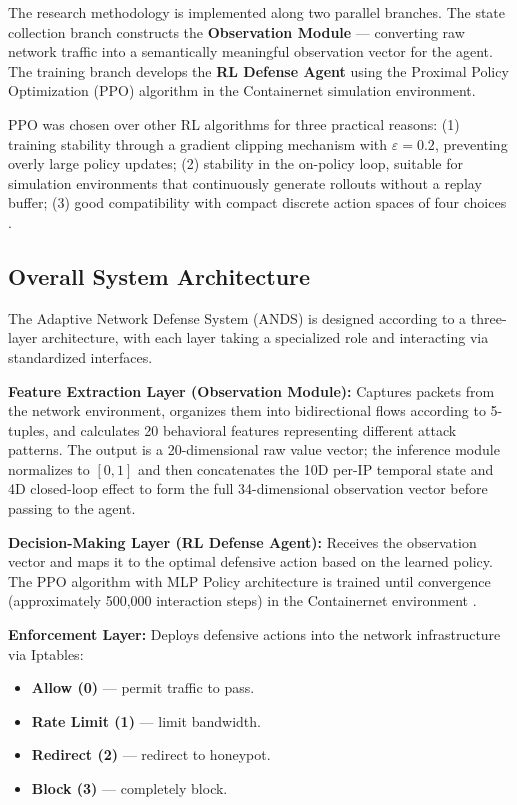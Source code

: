 \documentclass[12pt,a4paper]{report}
\begin{document}
The research methodology is implemented along two parallel branches. The state collection branch constructs the \textbf{Observation Module} --- converting raw network traffic into a semantically meaningful observation vector for the agent. The training branch develops the \textbf{RL Defense Agent} using the Proximal Policy Optimization (PPO) algorithm \cite{schulmanPPO2017} in the Containernet simulation environment.

PPO was chosen over other RL algorithms for three practical reasons: (1) training stability through a gradient clipping mechanism with $\varepsilon = 0.2$, preventing overly large policy updates; (2) stability in the on-policy loop, suitable for simulation environments that continuously generate rollouts without a replay buffer; (3) good compatibility with compact discrete action spaces of four choices \cite{schulmanPPO2017}.

\subsection{Overall System Architecture}

The Adaptive Network Defense System (ANDS) is designed according to a three-layer architecture, with each layer taking a specialized role and interacting via standardized interfaces.

\textbf{Feature Extraction Layer (Observation Module):} Captures packets from the network environment, organizes them into bidirectional flows according to 5-tuples, and calculates 20 behavioral features representing different attack patterns. The output is a 20-dimensional raw value vector; the inference module normalizes to $[0,1]$ and then concatenates the 10D per-IP temporal state and 4D closed-loop effect to form the full 34-dimensional observation vector before passing to the agent.

\textbf{Decision-Making Layer (RL Defense Agent):} Receives the observation vector and maps it to the optimal defensive action based on the learned policy. The PPO algorithm with MLP Policy architecture is trained until convergence (approximately 500,000 interaction steps) in the Containernet environment \cite{lantzMininet2010}.

\textbf{Enforcement Layer:} Deploys defensive actions into the network infrastructure via Iptables:
\begin{itemize}
  \item \textbf{Allow (0)} --- permit traffic to pass.
  \item \textbf{Rate Limit (1)} --- limit bandwidth.
  \item \textbf{Redirect (2)} --- redirect to honeypot.
  \item \textbf{Block (3)} --- completely block.
\end{itemize}
\end{document}
